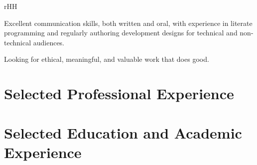 \documentclass{simplecv}
\newif\ifgithub
\begin{document}
\begin{minipage}{\textwidth}
\begin{tabular}{rHH}
  \end{tabular}

  \medskip

  Excellent communication skills, both written and oral, with
  experience in literate programming and regularly authoring
  development designs for technical and non-technical audiences.

  \medskip

  Looking for ethical, meaningful, and valuable work that does good.

\end{minipage}

\vfill
\section{Selected Professional Experience}


\section{Selected Education and Academic Experience}

\vfill \vfill
\newpage~
\ifgithub
\vfill
\section{Selected Open Source Contributions and Pro-Bono Work}

In addition to various contributions to other projects (ranging from
simple typos to small\slash substantial fixes and enhancements), I
also maintain many projects of my own on GitHub
(\censor{\href{http://www.github.com/vermiculus}{\texttt{@vermiculus}}}).
I find great enjoyment in enhancing developer toolsets and workflows.

\inputproject{magithub}
\inputproject{api-wrap}
\inputproject{emake}
\inputproject{sx.el}
\inputproject{ssa-tool}
\inputproject{snael}
\inputproject{auctex-lua}
\inputproject{butterseal}
\inputproject{lda-smc}

\fi
\vfill
\end{document}
